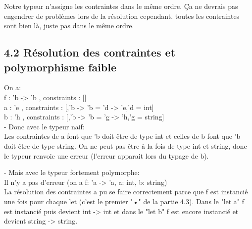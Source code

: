 \documentclass{article}
\begin{document}
{}
{}

{}
{}

{
  Notre typeur n'assigne les contraintes dans le même ordre. Ça ne 
  devrais pas engendrer de problèmes lors de la résolution cependant. toutes les
  contraintes sont bien là, juste pas dans le même ordre.
}
{}

\subsection{4.2 Résolution des contraintes et polymorphisme faible}

{}
{}

{
  On a:\\
  f : 'b -> 'b  , constraints : []\\
  a : 'e        , constraints : [,'b -> 'b = 'd -> 'e,'d = int]\\
  b : 'h        , constraints : [,'b -> 'b = 'g -> 'h,'g = string]\\

  - Donc avec le typeur naif:\\
  Les contraintes de a font que 'b doit être de type int et celles de b font que
  'b doit être de type string. On ne peut pas être à la fois de type int et
  string, donc le typeur renvoie une erreur (l'erreur apparait lors du typage de b).

  - Mais avec le typeur fortement polymorphe:\\
  Il n'y a pas d'erreur (on a f: 'a -> 'a, a: int, b: string)\\
  La résolution des contraintes a pu se faire correctement parce que f est 
  instancié une fois pour chaque let (c'est le premier "•" de la partie 4.3).
  Dans le "let a" f est instancié puis devient int -> int et dans le "let b" f est 
  encore instancié et devient string -> string.

}
{}
\end{document}
